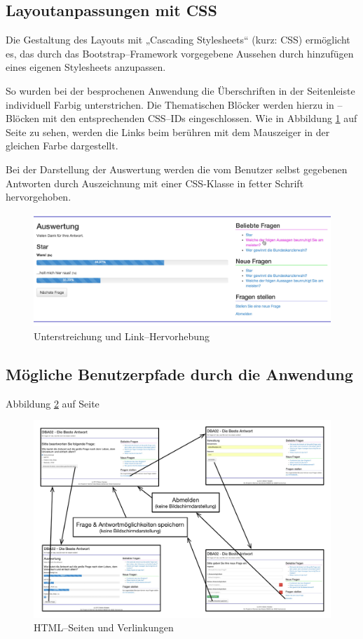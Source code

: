 \subsection{Layoutanpassungen mit CSS}

Die Gestaltung des Layouts mit „Cascading Stylesheets“ (kurz: CSS) ermöglicht es, das durch das Bootstrap--Framework vorgegebene Aussehen durch hinzufügen eines eigenen Stylesheets anzupassen.

So wurden bei der besprochenen Anwendung die Überschriften in der Seitenleiste individuell Farbig unterstrichen. Die Thematischen Blöcker werden hierzu in --Blöcken mit den entsprechenden CSS--IDs eingeschlossen. Wie in Abbildung \ref{fig:seitenleiste} auf Seite \pageref{fig:seitenleiste} zu sehen, werden die Links beim berühren mit dem Mauszeiger in der gleichen Farbe dargestellt.

Bei der Darstellung der Auswertung werden die vom Benutzer selbst gegebenen Antworten durch Auszeichnung mit einer CSS-Klasse in fetter Schrift hervorgehoben. 

\begin{figure}[h]
\begin{center}
\includegraphics[width=\textwidth]{seitenleiste.jpg}
\caption{Unterstreichung und Link--Hervorhebung}
\label{fig:seitenleiste}
\end{center}
\end{figure}



\subsection{Mögliche Benutzerpfade durch die Anwendung}

Abbildung \ref{fig:zustaende} auf Seite \pageref{fig:zustaende}

\begin{figure}[h]
\begin{center}
\includegraphics[width=\textwidth]{zustaende.jpg}
\caption{HTML--Seiten und Verlinkungen}
\label{fig:zustaende}
\end{center}
\end{figure}

